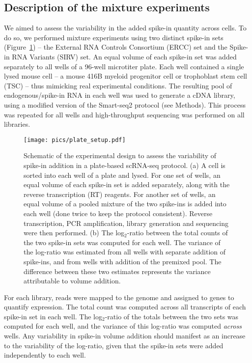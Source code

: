 \documentclass{article}
\begin{document}
\subsection*{Description of the mixture experiments}
We aimed to assess the variability in the added spike-in quantity across cells.
To do so, we performed mixture experiments using two distinct spike-in sets (Figure~\ref{fig:expdesign}) -- the External RNA Controls Consortium (ERCC) set and the Spike-in RNA Variants (SIRV) set.
An equal volume of each spike-in set was added separately to all wells of a 96-well microtiter plate.
Each well contained a single lysed mouse cell -- a mouse 416B myeloid progenitor cell or trophoblast stem cell (TSC) -- thus mimicking real experimental conditions.
The resulting pool of endogenous/spike-in RNA in each well was used to generate a cDNA library, using a modified version of the Smart-seq2 protocol (see Methods).
This process was repeated for all wells and high-throughput sequencing was performed on all libraries.

\begin{figure}[tbp]
\begin{center}
\texttt{[image: pics/plate\_setup.pdf]}
\end{center}
\caption{Schematic of the experimental design to assess the variability of spike-in addition in a plate-based scRNA-seq protocol.
(a) A cell is sorted into each well of a plate and lysed.
For one set of wells, an equal volume of each spike-in set is added separately, along with the reverse transcription (RT) reagents.
For another set of wells, an equal volume of a pooled mixture of the two spike-ins is added into each well (done twice to keep the protocol consistent).
Reverse transcription, PCR amplification, library generation and sequencing were then performed.
(b) The log$_2$-ratio between the total counts of the two spike-in sets was computed for each well.
The variance of the log-ratio was estimated from all wells with separate addition of spike-ins, and from wells with addition of the premixed pool.
The difference between these two estimates represents the variance attributable to volume addition.
}
\label{fig:expdesign}
\end{figure}

For each library, reads were mapped to the genome and assigned to genes to quantify expression.
The total count was computed across all transcripts of each spike-in set in each well.
The log$_2$-ratio of the totals between the two sets was computed for each well, and the variance of this log-ratio was computed \textit{across} wells.
Any variability in spike-in volume addition should manifest as an increase to the variability of the log-ratio, given that the spike-in sets were added independently to each well.
\end{document}
